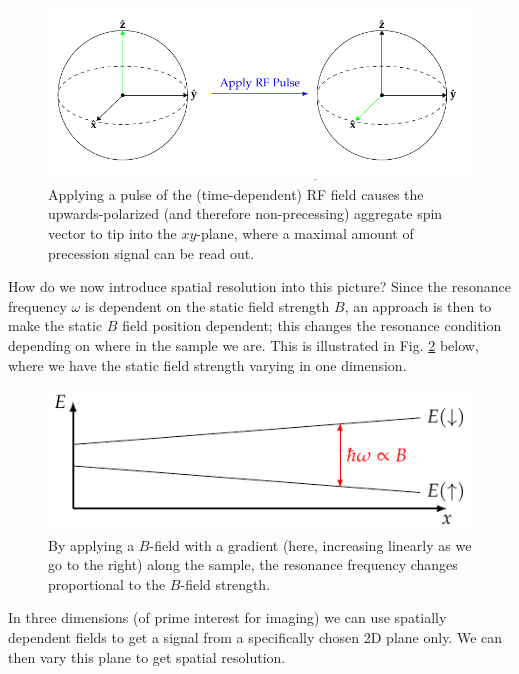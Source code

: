\begin{figure}[htbp]
    \centering
    \includegraphics{Images/fig-spintipping.pdf}

    \caption{Applying a pulse of the (time-dependent) RF field causes the upwards-polarized (and therefore non-precessing) aggregate spin vector to tip into the $xy$-plane, where a maximal amount of precession signal can be read out.}
    \label{fig-spintipping}
\end{figure}

How do we now introduce spatial resolution into this picture? Since the resonance frequency $\omega$ is dependent on the static field strength $B$, an approach is then to make the static $B$ field position dependent; this changes the resonance condition depending on where in the sample we are. This is illustrated in Fig. \ref{fig-1DBgradient} below, where we have the static field strength varying in one dimension.

\begin{figure}[htbp]
    \centering
    \includegraphics{Images/fig-1DBgradient.pdf}

    \caption{By applying a $B$-field with a gradient (here, increasing linearly as we go to the right) along the sample, the resonance frequency changes proportional to the $B$-field strength.}
    \label{fig-1DBgradient}
\end{figure}

In three dimensions (of prime interest for imaging) we can use spatially dependent fields to get a signal from a specifically chosen 2D plane only. We can then vary this plane to get spatial resolution.

